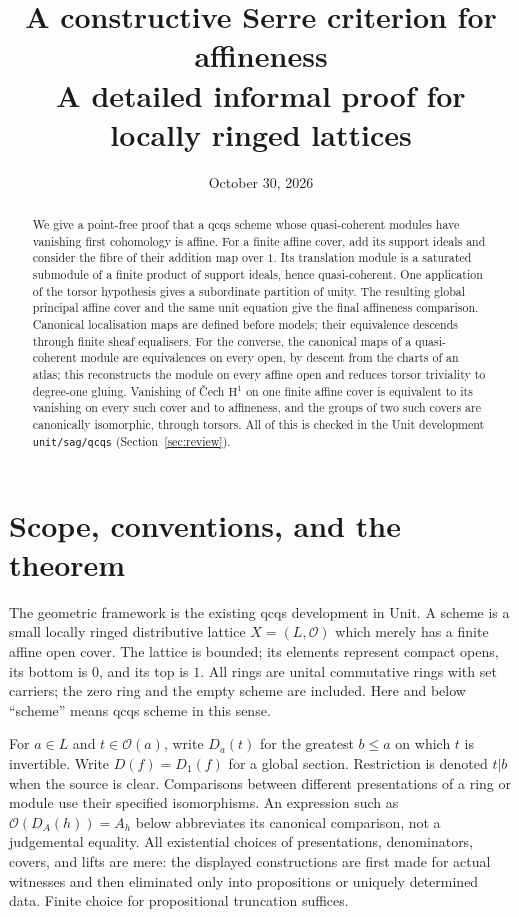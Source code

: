 \documentclass[11pt]{amsart}
\title[Constructive Serre affineness]{A constructive Serre criterion for affineness\\A detailed informal proof for locally ringed lattices}
\date{October 30, 2026}
\theoremstyle{definition}\newtheorem{definition}[theorem]{Definition}
\theoremstyle{remark}\newtheorem{remark}[theorem]{Remark}
\newcommand{\OO}{\mathcal O}
\newcommand{\HH}{\mathrm H}
\newcommand{\code}[1]{{\small\texttt{#1}}}
\begin{document}
\raggedbottom

\begin{abstract}
We give a point-free proof that a qcqs scheme whose quasi-coherent
modules have vanishing first cohomology is affine. For a finite affine
cover, add its support ideals and consider the fibre of their addition
map over $1$. Its translation module is a saturated submodule of a
finite product of support ideals, hence quasi-coherent. One application of the
torsor hypothesis gives a subordinate partition of unity. The resulting
global principal affine cover and the same unit equation give the final
affineness comparison. Canonical localisation maps are defined before
models; their equivalence descends through finite sheaf equalisers.
For the converse, the canonical maps of a quasi-coherent module are
equivalences on every open, by descent from the charts of an atlas; this
reconstructs the module on every affine open and reduces torsor
triviality to degree-one gluing. Vanishing of \v{C}ech $\HH^1$ on one
finite affine cover is equivalent to its vanishing on every such cover
and to affineness, and the groups of two such covers are canonically
isomorphic, through torsors. All of this is checked in the Unit
development \code{unit/sag/qcqs} (Section~\ref{sec:review}).
\end{abstract}
\maketitle

\section{Scope, conventions, and the theorem}
The geometric framework is the existing qcqs development in Unit.
A scheme is a small locally ringed distributive lattice
$X=(L,\OO)$ which merely has a finite affine open cover. The lattice
is bounded; its elements represent compact opens, its bottom is $0$,
and its top is $1$. All rings are unital commutative rings with set
carriers; the zero ring and the empty scheme are included.
Here and below ``scheme'' means qcqs scheme in this sense.

For $a\in L$ and $t\in\OO(a)$, write $D_a(t)$ for the greatest
$b\le a$ on which $t$ is invertible. Write $D(f)=D_1(f)$ for a
global section. Restriction is denoted $t|b$ when the source is clear.
Comparisons between different presentations of a ring or module use
their specified isomorphisms. An expression such as $\OO(D_A(h))=A_h$
below abbreviates its canonical comparison, not a judgemental equality.
All existential choices of presentations, denominators, covers, and
lifts are mere: the displayed constructions are first made for actual
witnesses and then eliminated only into propositions or uniquely
determined data. Finite choice for propositional truncation suffices.
\end{document}
